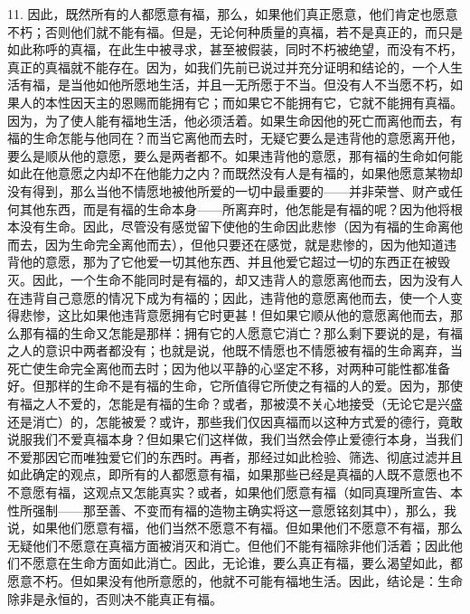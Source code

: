 11. 因此，既然所有的人都愿意有福，那么，如果他们真正愿意，他们肯定也愿意不朽；否则他们就不能有福。但是，无论何种质量的真福，若不是真正的，而只是如此称呼的真福，在此生中被寻求，甚至被假装，同时不朽被绝望，而没有不朽，真正的真福就不能存在。因为，如我们先前已说过并充分证明和结论的，一个人生活有福，是当他如他所愿地生活，并且一无所愿于不当。但没有人不当愿不朽，如果人的本性因天主的恩赐而能拥有它；而如果它不能拥有它，它就不能拥有真福。因为，为了使人能有福地生活，他必须活着。如果生命因他的死亡而离他而去，有福的生命怎能与他同在？而当它离他而去时，无疑它要么是违背他的意愿离开他，要么是顺从他的意愿，要么是两者都不。如果违背他的意愿，那有福的生命如何能如此在他意愿之内却不在他能力之内？而既然没有人是有福的，如果他愿意某物却没有得到，那么当他不情愿地被他所爱的一切中最重要的——并非荣誉、财产或任何其他东西，而是有福的生命本身——所离弃时，他怎能是有福的呢？因为他将根本没有生命。因此，尽管没有感觉留下使他的生命因此悲惨（因为有福的生命离他而去，因为生命完全离他而去），但他只要还在感觉，就是悲惨的，因为他知道违背他的意愿，那为了它他爱一切其他东西、并且他爱它超过一切的东西正在被毁灭。因此，一个生命不能同时是有福的，却又违背人的意愿离他而去，因为没有人在违背自己意愿的情况下成为有福的；因此，违背他的意愿离他而去，使一个人变得悲惨，这比如果他违背意愿拥有它时更甚！但如果它顺从他的意愿离他而去，那么那有福的生命又怎能是那样：拥有它的人愿意它消亡？那么剩下要说的是，有福之人的意识中两者都没有；也就是说，他既不情愿也不情愿被有福的生命离弃，当死亡使生命完全离他而去时；因为他以平静的心坚定不移，对两种可能性都准备好。但那样的生命不是有福的生命，它所值得它所使之有福的人的爱。因为，那使有福之人不爱的，怎能是有福的生命？或者，那被漠不关心地接受（无论它是兴盛还是消亡）的，怎能被爱？或许，那些我们仅因真福而以这种方式爱的德行，竟敢说服我们不爱真福本身？但如果它们这样做，我们当然会停止爱德行本身，当我们不爱那因它而唯独爱它们的东西时。再者，那经过如此检验、筛选、彻底过滤并且如此确定的观点，即所有的人都愿意有福，如果那些已经是真福的人既不意愿也不不意愿有福，这观点又怎能真实？或者，如果他们愿意有福（如同真理所宣告、本性所强制——那至善、不变而有福的造物主确实将这一意愿铭刻其中），那么，我说，如果他们愿意有福，他们当然不愿意不有福。但如果他们不愿意不有福，那么无疑他们不愿意在真福方面被消灭和消亡。但他们不能有福除非他们活着；因此他们不愿意在生命方面如此消亡。因此，无论谁，要么真正有福，要么渴望如此，都愿意不朽。但如果没有他所意愿的，他就不可能有福地生活。因此，结论是：生命除非是永恒的，否则决不能真正有福。\par


